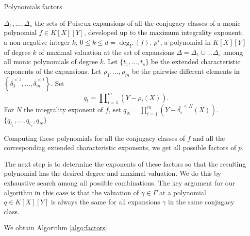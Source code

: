 \documentclass[a4paper,11pt]{amsart}%
\theoremstyle{definition}
\theoremstyle{plain}
\theoremstyle{remark}
\begin{document}
\begin{algorithm}[h]                      %
\caption{Polynomials factors}          %
\label{algo:factors}
\begin{algorithmic}[1]
\REQUIRE $\Delta_1, \dots, \Delta_s$ the sets of Puiseux expansions of all the conjugacy classes of a monic polynomial $f \in K[X][Y]$, developed up to the maximum integrality exponent; a non-negative integer $k$, $0 \leq k \leq d = \deg_Y(f)$.
\ENSURE $p^{\star}$, a polynomial in $K[X][Y]$ of degree $k$ of maximal valuation at the set of expansions $\Delta = \Delta_1 \cup \dots \Delta_s$ among all monic polynomials of degree $k$.
\STATE Let $\{t_1, \dots, t_s\}$ be the extended characteristic exponents of the expansions.
\STATE Let $\rho_{1},\ldots, \rho_{\overline{m}}$ be the pairwise different elements in $\left\{  \overline{\delta}_{1}^{<t},\ldots,\overline{\delta}_{m}^{<t}\right\}$.
\STATE Set
$$
q_t=\prod\nolimits_{i=1}^{\overline{m}}(Y-\rho_{i}(X)).
$$
\ENDFOR
\STATE For $N$ the integrality exponent of $f$, set $q_N = \prod\nolimits_{i=1}^{m}(Y-\overline{\delta_{i}}^{\le N}(X))$.
\RETURN $\{q_{t_1}, \dots, q_{t_s}, q_N\}$
\end{algorithmic}
\end{algorithm}

Computing these polynomials for all the conjugacy classes of $f$ and all the corresponding extended characteristic exponents, we get all possible factors of $p$.

The next step is to determine the exponents of these factors so that the resulting polynomial has the desired degree and maximal valuation. We do this by exhaustive search among all possible combinations.
The key argument for our algorithm in this case is that the valuation of $\gamma \in \Gamma$ at a polynomial $q \in K[X][Y]$ is always the same for all expansions $\gamma$ in the same conjugacy class.

We obtain Algorithm \ref{algo:factors}.
\end{document}
